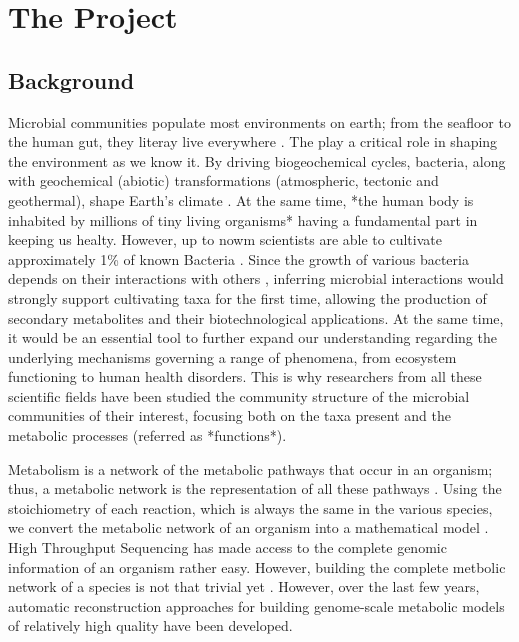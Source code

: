 \documentclass{article}
\begin{document}

\section{The Project}
\subsection{Background}
Microbial communities populate most environments on earth; from the seafloor to the
human gut, they literay live everywhere \cite{reise2009item}.
The play a critical role in shaping the environment as we know it.  
By driving biogeochemical cycles, 
bacteria, along with geochemical (abiotic) transformations (atmospheric, tectonic and geothermal), shape Earth's climate \cite{falkowski2008microbial}.
At the same time, *the human body is inhabited by millions of tiny living organisms* 
having a fundamental part in keeping us healty\cite{da2017we}. 
However, up to nowm scientists are able to cultivate approximately 1\% of known Bacteria \cite{tang2019microbial}. 
Since the growth of various bacteria depends on their interactions with others \cite{wade2002unculturable}, inferring microbial interactions would strongly support cultivating taxa for the first time, allowing the production of secondary metabolites and their biotechnological applications.
At the same time, it would be an essential tool to further expand our understanding
regarding the underlying mechanisms governing a range of phenomena, from ecosystem 
functioning to human health disorders.
This is why researchers from all these scientific fields have been studied the 
community structure of the microbial communities of their interest, 
focusing both on the taxa present and the metabolic processes (referred as *functions*). 

Metabolism is a network of the metabolic pathways that occur in an organism; thus, a metabolic network is the representation of all these pathways \cite{palsson2015systems}.
Using the stoichiometry of each reaction, which is always the same in the various species,
we convert the metabolic network of an organism into a mathematical model \cite{palsson2015systems}.
High Throughput Sequencing has made access to the complete genomic information of an organism rather easy. 
However, building the complete metbolic network of a species is not that trivial yet 
\cite{thiele2010protocol}.
However, over the last few years, automatic reconstruction approaches for building genome-scale metabolic models \cite{machado2018fast} of relatively high quality have been developed.
\end{document}
